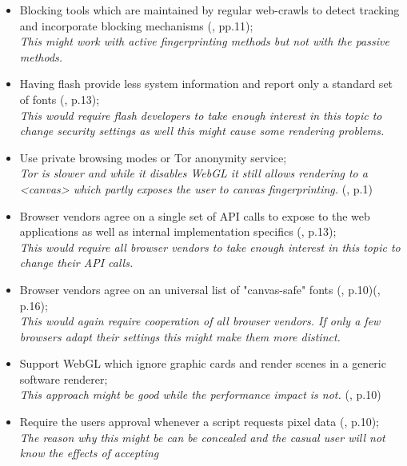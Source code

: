 \begin{itemize}
	\item Blocking tools which are maintained by regular web-crawls to detect tracking and incorporate blocking mechanisms (\textcite{acar14}, pp.11);\\
	\textit{This might work with active fingerprinting methods but not with the passive methods.}

	\item Having flash provide less system information and report only a standard set of fonts (\textcite{nikiforakis13}, p.13);\\
	\textit{This would require flash developers to take enough interest in this topic to change security settings as well this might cause some rendering problems.}
	
	\item Use private browsing modes or Tor anonymity service;\\
	\textit{Tor is slower and while it disables WebGL it still allows rendering to a <canvas> which partly exposes the user to canvas fingerprinting.} (\textcite{mowery12}, p.1)
	
	\item Browser vendors agree on a single set of API calls to expose to the web applications as well as internal implementation specifics (\textcite{nikiforakis13}, p.13);\\
	\textit{This would require all browser vendors to take enough interest in this topic to change their API calls.}
	
	\item Browser vendors agree on an universal list of "canvas-safe" fonts (\textcite{mowery12}, p.10)(\textcite{boda11}, p.16);\\
	\textit{This would again require cooperation of all browser vendors. If only a few browsers adapt their settings this might make them more distinct.} 
	
	\item Support WebGL which ignore graphic cards and render scenes in a generic software renderer;\\
	\textit{This approach might be good while the performance impact is not.} (\textcite{mowery12}, p.10)
	
	\item Require the users approval whenever a script requests pixel data  (\textcite{mowery12}, p.10);\\
	\textit{The reason why this might be can be concealed and the casual user will not know the effects of accepting}
	

\end{itemize}
